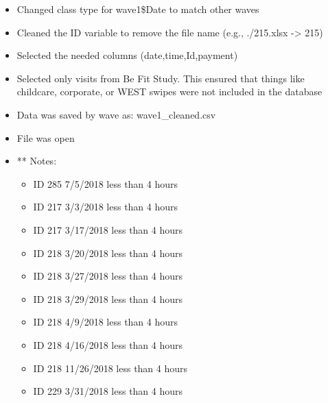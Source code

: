 \documentclass[
]{book}
\providecommand{\tightlist}{%
  \setlength{\itemsep}{0pt}\setlength{\parskip}{0pt}}
\begin{document}
\begin{itemize}
\tightlist
\item
  Changed class type for wave1\$Date to match other waves
\item
  Cleaned the ID variable to remove the file name (e.g., ./215.xlsx -\textgreater{} 215)
\item
  Selected the needed columns (date,time,Id,payment)
\item
  Selected only visits from Be Fit Study. This ensured that things like childcare, corporate, or WEST swipes were not included in the database
\item
  Data was saved by wave as: wave1\_cleaned.csv
\item
  File was open
\item
  ** Notes:

  \begin{itemize}
  \tightlist
  \item
    ID 285 7/5/2018 less than 4 hours
  \item
    ID 217 3/3/2018 less than 4 hours
  \item
    ID 217 3/17/2018 less than 4 hours
  \item
    ID 218 3/20/2018 less than 4 hours
  \item
    ID 218 3/27/2018 less than 4 hours
  \item
    ID 218 3/29/2018 less than 4 hours
  \item
    ID 218 4/9/2018 less than 4 hours
  \item
    ID 218 4/16/2018 less than 4 hours
  \item
    ID 218 11/26/2018 less than 4 hours
  \item
    ID 229 3/31/2018 less than 4 hours
  \end{itemize}
\end{itemize}
\end{document}

